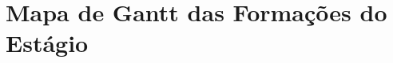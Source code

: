 \section{Mapa de Gantt das Formações do Estágio}\label{anexo_formacoes}

\renewcommand*{\thepage}{B\arabic{page}}


\begin{figure}[H]
    \centering

    \def\pgfcalendarweekdayletter#1{%
      \ifcase#1\tiny{M}\or \tiny{T}\or \tiny{W}\or \tiny{T}\or \tiny{F}\or \tiny{S}\or \tiny{S}\fi%
    }

    


\end{figure}
